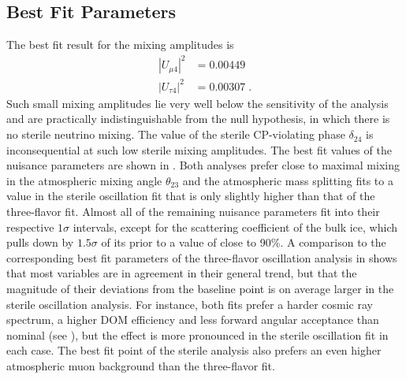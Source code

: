 \subsection{Best Fit Parameters}
The best fit result for the mixing amplitudes is
\begin{align*}
    |U_{\mu 4}|^2  &= 0.00449 \\
    |U_{\tau 4}|^2 &= 0.00307\;.
\end{align*}
Such small mixing amplitudes lie very well below the sensitivity of the analysis and are practically indistinguishable from the null hypothesis, in which there is no sterile neutrino mixing. The value of the sterile CP-violating phase $\delta_{24}$ is inconsequential at such low sterile mixing amplitudes. The best fit values of the nuisance parameters are shown in . Both analyses prefer close to maximal mixing in the atmospheric mixing angle $\theta_{23}$ and the atmospheric mass splitting fits to a value in the sterile oscillation fit that is only slightly higher than that of the three-flavor fit. Almost all of the remaining nuisance parameters fit into their respective $1\sigma$ intervals, except for the scattering coefficient of the bulk ice, which pulls down by $1.5\sigma$ of its prior to a value of close to 90\%. A comparison to the corresponding best fit parameters of the three-flavor oscillation analysis in  shows that most variables are in agreement in their general trend, but that the magnitude of their deviations from the baseline point is on average larger in the sterile oscillation analysis. For instance, both fits prefer a harder cosmic ray spectrum, a higher DOM efficiency and less forward angular acceptance than nominal (see ), but the effect is more pronounced in the sterile oscillation fit in each case. The best fit point of the sterile analysis also prefers an even higher atmospheric muon background than the three-flavor fit.

